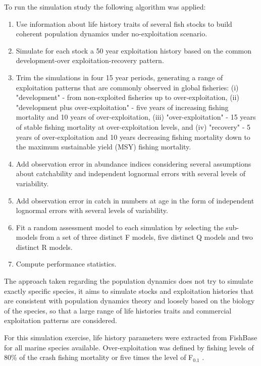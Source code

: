 \documentclass[a4paper]{article}\usepackage{graphicx, color}
\begin{document}
To run the simulation study the following algorithm was applied:
\begin{enumerate}
	\item Use information about life history traits of several fish stocks to build coherent population dynamics under no-exploitation scenario.
	\item Simulate for each stock a 50 year exploitation history based on the common development-over exploitation-recovery pattern.
	\item Trim the simulations in four 15 year periods, generating a range of exploitation patterns that are commonly observed in global fisheries: (i) "development" - from non-exploited fisheries up to over-exploitation, (ii) "development plus over-exploitation" - five years of increasing fishing mortality and 10 years of over-exploitation, (iii) "over-exploitation" - 15 years of stable fishing mortality at over-exploitation levels, and (iv) "recovery" - 5 years of over-exploitation and 10 years decreasing fishing mortality down to the maximum sustainable yield (MSY) fishing mortality.
	\item Add observation error in abundance indices considering several assumptions about catchability and independent lognormal errors with several levels of variability.
	\item Add observation error in catch in numbers at age in the form of independent lognormal errors with several levels of variability.
	\item Fit a random assessment model to each simulation by selecting the sub-models from a set of three distinct F models, five distinct Q models and two distinct R models.
	\item Compute performance statistics.
\end{enumerate}

The approach taken regarding the population dynamics does not try to simulate exactly specific species, it aims to simulate stocks and exploitation histories that are consistent with population dynamics theory and loosely based on the biology of the species, so that a large range of life histories traits and commercial exploitation patterns are considered.     

For this simulation exercise, life history parameters were extracted from FishBase \cite{froesefishbase2013} for all marine species available. Over-exploitation was defined by fishing levels of 80\% of the crash fishing mortality \cite{quinn1999quantitative} or five times the level of F$_{0.1}$ \cite{gullandF0.1}. 
\end{document}

